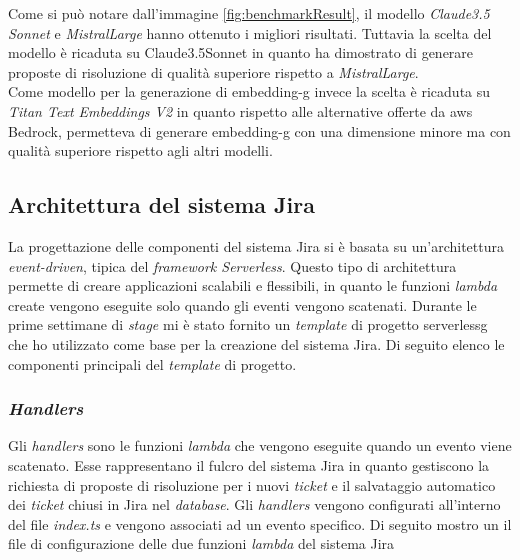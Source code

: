 Come si può notare dall'immagine \ref{fig:benchmarkResult}, il modello \textit{Claude3.5 Sonnet} e \textit{MistralLarge} hanno ottenuto i migliori risultati. Tuttavia la scelta del modello è ricaduta su Claude3.5Sonnet in quanto ha dimostrato di generare proposte di risoluzione di qualità superiore rispetto a \textit{MistralLarge}.\\
Come modello per la generazione di \gls{embedding-g} invece la scelta è ricaduta su \textit{Titan Text Embeddings V2} in quanto rispetto alle alternative offerte da \gls{aws} Bedrock, permetteva di generare \gls{embedding-g} con una dimensione minore ma con qualità superiore rispetto agli altri modelli.

\subsection{Architettura del sistema Jira}
La progettazione delle componenti del sistema Jira si è basata su un'architettura \textit{event-driven}, tipica del \textit{framework Serverless}. Questo tipo di architettura permette di creare applicazioni scalabili e flessibili, in quanto le funzioni \textit{lambda} create vengono eseguite solo quando gli eventi vengono scatenati. 
Durante le prime settimane di \textit{stage} mi è stato fornito un \textit{template} di progetto \gls{serverlessg} che ho utilizzato come base per la creazione del sistema Jira. Di seguito elenco le componenti principali del \textit{template} di progetto.

\subsubsection{\textit{Handlers}}
Gli \textit{handlers} sono le funzioni \textit{lambda} che vengono eseguite quando un evento viene scatenato. Esse rappresentano il fulcro del sistema Jira in quanto gestiscono la richiesta di proposte di risoluzione per i nuovi \textit{ticket} e il salvataggio automatico dei \textit{ticket} chiusi in Jira nel \textit{database}. 
Gli \textit{handlers} vengono configurati all'interno del file \textit{index.ts} e vengono associati ad un evento specifico. Di seguito mostro un il file di configurazione delle due funzioni \textit{lambda} del sistema Jira

